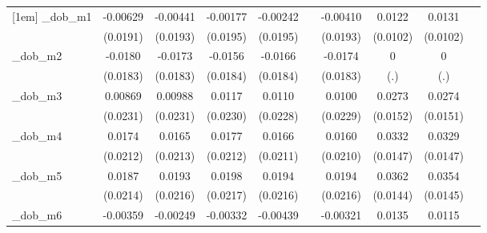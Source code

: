 \begin{table}[htbp]
\begin{tabular}{l*{9}{c}}
[1em]
\_dob\_m1     &    -0.00629         &    -0.00441         &    -0.00177         &    -0.00242         &                     &    -0.00410         &      0.0122         &      0.0131         &                     \\
            &    (0.0191)         &    (0.0193)         &    (0.0195)         &    (0.0195)         &                     &    (0.0193)         &    (0.0102)         &    (0.0102)         &                     \\
[1em]
\_dob\_m2     &     -0.0180         &     -0.0173         &     -0.0156         &     -0.0166         &                     &     -0.0174         &           0         &           0         &                     \\
            &    (0.0183)         &    (0.0183)         &    (0.0184)         &    (0.0184)         &                     &    (0.0183)         &         (.)         &         (.)         &                     \\
[1em]
\_dob\_m3     &     0.00869         &     0.00988         &      0.0117         &      0.0110         &                     &      0.0100         &      0.0273\sym{*}  &      0.0274\sym{*}  &                     \\
            &    (0.0231)         &    (0.0231)         &    (0.0230)         &    (0.0228)         &                     &    (0.0229)         &    (0.0152)         &    (0.0151)         &                     \\
[1em]
\_dob\_m4     &      0.0174         &      0.0165         &      0.0177         &      0.0166         &                     &      0.0160         &      0.0332\sym{**} &      0.0329\sym{**} &                     \\
            &    (0.0212)         &    (0.0213)         &    (0.0212)         &    (0.0211)         &                     &    (0.0210)         &    (0.0147)         &    (0.0147)         &                     \\
[1em]
\_dob\_m5     &      0.0187         &      0.0193         &      0.0198         &      0.0194         &                     &      0.0194         &      0.0362\sym{**} &      0.0354\sym{**} &                     \\
            &    (0.0214)         &    (0.0216)         &    (0.0217)         &    (0.0216)         &                     &    (0.0216)         &    (0.0144)         &    (0.0145)         &                     \\
[1em]
\_dob\_m6     &    -0.00359         &    -0.00249         &    -0.00332         &    -0.00439         &                     &    -0.00321         &      0.0135         &      0.0115         &                     \\

\end{tabular}
\end{table}
